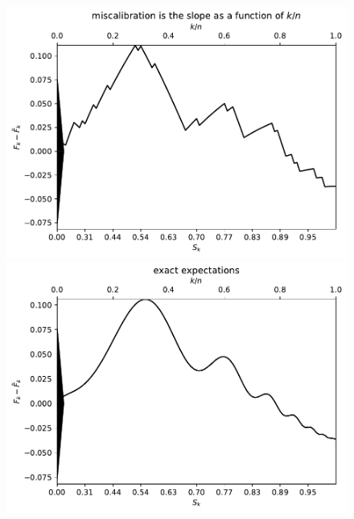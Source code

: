 \documentclass{article}
\begin{document}
\begin{figure}
\begin{centering}

\parbox{\imsize}{\includegraphics[width=\imsize]
                {./codes/unweighted/100_4_2_1/cumulative.pdf}}
\quad\quad
\parbox{\imsize}{\includegraphics[width=\imsize]
                {./codes/unweighted/100_4_2_1/cumulative_exact.pdf}}

\vspace{\vertsep}


\end{centering}
\end{figure}
\end{document}
